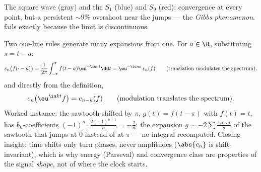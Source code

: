 \begin{omfigure}

{\small The square wave (gray) and the  $S_1$
(blue) and $S_9$ (red): convergence at every  point, but
a persistent $\sim 9\%$ overshoot near the jumps --- the
\emph{Gibbs phenomenon}.  fails exactly because the limit is discontinuous.}
\end{omfigure}

\begin{example}\label{ex:b2:fourier:shiftrules}
Two one-line rules generate many expansions from one. For $a
\in \R$, substituting $s = t - a$:
\[
c_n\bigl(f(\cdot - a)\bigr)
= \frac{1}{2\pi}\int_{-\pi}^{\pi}f(t - a)\eu^{-\iu nt}\dd t
= \eu^{-\iu na}\,c_n(f)
\qquad\text{(translation modulates the spectrum)},
\]
and directly from the definition,
\[
c_n\bigl(\eu^{\iu kt}f\bigr) = c_{n-k}(f)
\qquad\text{(modulation translates the spectrum)}.
\]
Worked instance: the sawtooth shifted by $\pi$, $g(t) = f(t -
\pi)$ with $f(t) = t$, has $b_n$-coefficients
$(-1)^n\cdot\frac{2(-1)^{n+1}}{n} = -\frac2n$: the expansion
$g \sim -2\sum\frac{\sin nt}{n}$ of the sawtooth that jumps at
$0$ instead of at $\pi$ --- no integral recomputed. Closing
insight: time shifts only turn phases, never amplitudes
($\abs{c_n}$ is shift-invariant), which is why energy
(Parseval) and convergence class are properties of the signal
\emph{shape}, not of where the clock starts.
\end{example}

